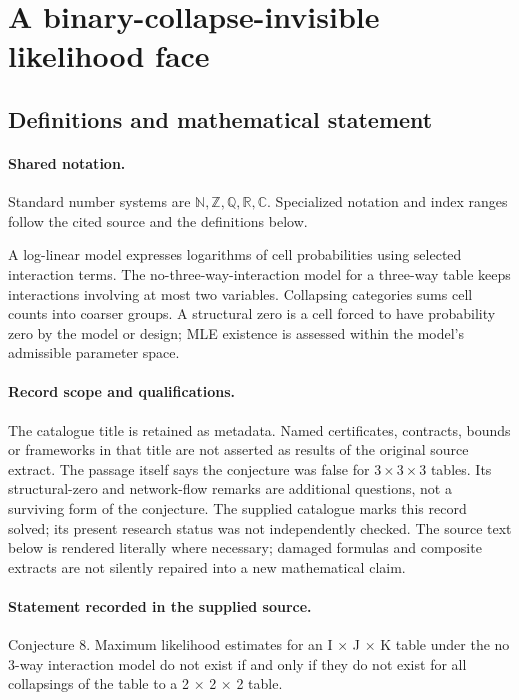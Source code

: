 \documentclass[11pt]{article}
\begin{document}
\section{A binary-collapse-invisible likelihood face}\label{statement}

\subsection{Definitions and mathematical statement}

\paragraph{Shared notation.}Standard number systems are $\mathbb N,\mathbb Z,\mathbb Q,\mathbb R,\mathbb C$. Specialized notation and index ranges follow the cited source and the definitions below.


A log-linear model expresses logarithms of cell probabilities using selected interaction terms. The no-three-way-interaction model for a three-way table keeps interactions involving at most two variables. Collapsing categories sums cell counts into coarser groups. A structural zero is a cell forced to have probability zero by the model or design; MLE existence is assessed within the model's admissible parameter space.
\paragraph{Record scope and qualifications.}
The catalogue title is retained as metadata. Named certificates, contracts, bounds or frameworks in that title are not asserted as results of the original source extract.
The passage itself says the conjecture was false for $3\times3\times3$ tables. Its structural-zero and network-flow remarks are additional questions, not a surviving form of the conjecture. The supplied catalogue marks this record solved; its present research status was not independently checked.
The source text below is rendered literally where necessary; damaged formulas and composite extracts are not silently repaired into a new mathematical claim.
\paragraph{Statement recorded in the supplied source.}
Conjecture 8. Maximum likelihood estimates for an I × J × K table under the no 3-way interaction model do not exist if and only if they do not exist for all collapsings of the table to a 2 × 2 × 2 table.
\end{document}
